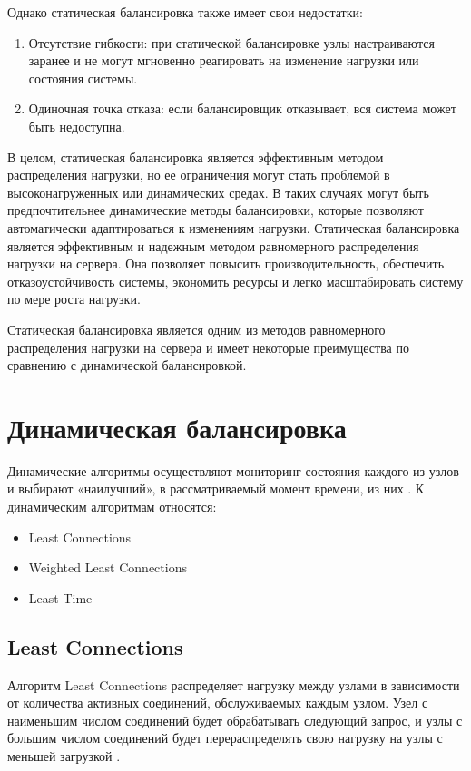 Однако статическая балансировка также имеет свои недостатки:
\begin{enumerate}[label=---]
	\item Отсутствие гибкости: при статической балансировке узлы настраиваются заранее и не могут мгновенно реагировать на изменение нагрузки или состояния системы.
	\item Одиночная точка отказа: если балансировщик отказывает, вся система может быть недоступна.
\end{enumerate}

В целом, статическая балансировка является эффективным методом распределения нагрузки, но ее ограничения могут стать проблемой в высоконагруженных или динамических средах. В таких случаях могут быть предпочтительнее динамические методы балансировки, которые позволяют автоматически адаптироваться к изменениям нагрузки.
Статическая балансировка является эффективным и надежным методом равномерного распределения нагрузки на сервера. Она позволяет повысить производительность, обеспечить отказоустойчивость системы, экономить ресурсы и легко масштабировать систему по мере роста нагрузки.

Статическая балансировка является одним из методов равномерного распределения нагрузки на сервера и имеет некоторые преимущества по сравнению с динамической балансировкой.
\cite{6}

\section{Динамическая балансировка}
Динамические алгоритмы осуществляют мониторинг состояния каждого
из узлов и выбирают «наилучший», в рассматриваемый момент времени, из них \cite{webmanage}. К динамическим алгоритмам относятся:
\begin{itemize}
	\item Least Connections
	\item Weighted Least Connections
	\item Least Time
\end{itemize}
\subsection{Least Connections}
Алгоритм Least Connections распределяет нагрузку между узлами в зависимости от количества активных соединений, обслуживаемых каждым узлом. Узел с наименьшим числом соединений будет обрабатывать следующий запрос, и узлы с большим числом соединений будет перераспределять свою нагрузку на узлы с меньшей загрузкой \cite{leastconnection}. 

